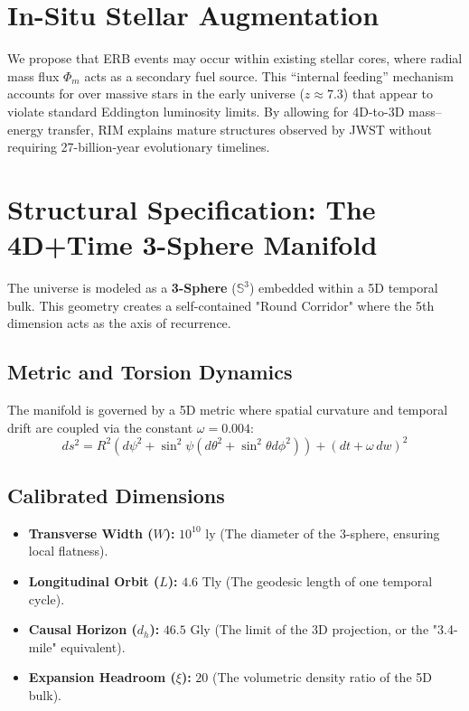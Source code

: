 \documentclass[12pt]{article}
\begin{document}
\section{In-Situ Stellar Augmentation}
We propose that ERB events may occur within existing stellar cores, where radial mass flux $\Phi_m$ acts as a secondary fuel source. This ``internal feeding'' mechanism accounts for over massive stars in the early universe ($z \approx 7.3$) that appear to violate standard Eddington luminosity limits. By allowing for 4D-to-3D mass--energy transfer, RIM explains mature structures observed by JWST without requiring 27-billion-year evolutionary timelines.

\section{Structural Specification: The 4D+Time 3-Sphere Manifold}
The universe is modeled as a \textbf{3-Sphere} ($\mathbb{S}^3$) embedded within a 5D temporal bulk. This geometry creates a self-contained "Round Corridor" where the 5th dimension acts as the axis of recurrence.

\subsection{Metric and Torsion Dynamics}
The manifold is governed by a 5D metric where spatial curvature and temporal drift are coupled via the constant $\omega = 0.004$:
\begin{equation}
ds^2 = R^2(d\psi^2 + \sin^2\psi(d\theta^2 + \sin^2\theta d\phi^2)) + (dt + \omega \, dw)^2
\end{equation}

\subsection{Calibrated Dimensions}
\begin{itemize}
    \item \textbf{Transverse Width ($W$):} $10^{10} \text{ ly}$ (The diameter of the 3-sphere, ensuring local flatness).
    \item \textbf{Longitudinal Orbit ($L$):} $4.6 \text{ Tly}$ (The geodesic length of one temporal cycle).
    \item \textbf{Causal Horizon ($d_h$):} $46.5 \text{ Gly}$ (The limit of the 3D projection, or the "3.4-mile" equivalent).
    \item \textbf{Expansion Headroom ($\xi$):} $20$ (The volumetric density ratio of the 5D bulk).
\end{itemize}
\end{document}
